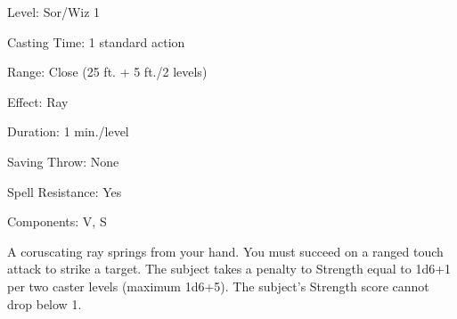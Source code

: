 
\begin{description*}
\item[Level:] Sor/Wiz 1
\item[Casting Time:] 1 standard action
\item[Range:] Close (25 ft. + 5 ft./2 levels)
\item[Effect:] Ray
\item[Duration:] 1 min./level
\item[Saving Throw:] None
\item[Spell Resistance:] Yes
\item[Components:] V, S
\end{description*}

A coruscating ray springs from your hand. You must succeed on a ranged touch attack
to strike a target. The subject takes a penalty to Strength equal to 1d6+1 per
two caster levels (maximum 1d6+5). The subject's Strength score cannot drop below
1.